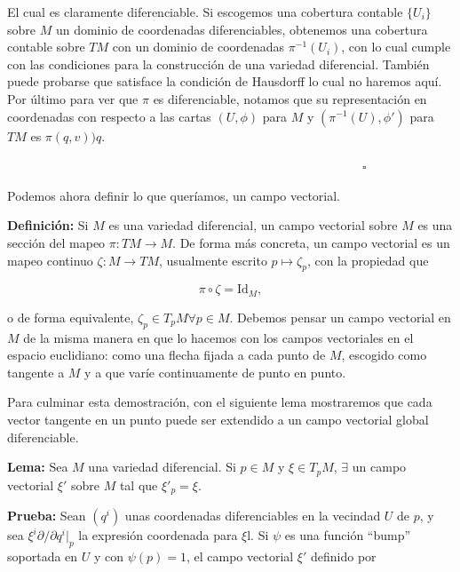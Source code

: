 \documentclass[a4paper,10pt]{article}
\numberwithin{equation}{section}
\newcommand{\definicion}{\textbf{Definición: }}
\newcommand{\lema}{\textbf{Lema: }}
\newcommand{\prueba}{\textbf{Prueba: }}
\begin{document}
El cual es claramente diferenciable. Si escogemos una cobertura contable 
$\{U_i\}$ sobre $M$ un dominio de coordenadas diferenciables, obtenemos 
una cobertura contable sobre $TM$ con un dominio de coordenadas ${\pi^{-1}(U_i)}$,
con lo cual cumple con las condiciones para la construcción de una variedad 
diferencial. También puede probarse que satisface la condición de Hausdorff 
lo cual no haremos aquí. Por último para ver que $\pi$ es diferenciable, 
notamos que su representación en coordenadas con respecto a las cartas 
$(U,\phi)$ para $M$ y $(\pi^{-1}(U),\phi')$ para $TM$ es $\pi(q,v))q$.

$\hspace{12cm} \square$

Podemos ahora definir lo que queríamos, un campo vectorial.

\vspace{.3cm}

\definicion Si $M$ es una variedad diferencial, un campo vectorial 
sobre $M$ es una sección del mapeo $\pi:TM \rightarrow M$. De forma 
más concreta, un campo vectorial es un mapeo continuo $\zeta:M \rightarrow TM$, 
usualmente escrito $p \mapsto \zeta_p$, con la propiedad que 

\begin{equation}
 \pi \circ \zeta = \text{Id}_M,
\end{equation}

o de forma equivalente, $\zeta_p \in T_p M \forall p \in M$. Debemos pensar un 
campo vectorial en $M$ de la misma manera en que lo hacemos con los campos vectoriales 
en el espacio euclidiano: como una flecha fijada a cada punto de $M$, escogido como 
tangente a $M$ y a que varíe continuamente de punto en punto.

\vspace{.3cm}

Para culminar esta demostración, con el siguiente lema mostraremos que cada vector 
tangente en un punto puede ser extendido a un campo vectorial global diferenciable.

\vspace{.3cm}

\lema Sea $M$ una variedad diferencial. Si $p \in M$ y $\xi \in T_p M$, $\exists$ un 
campo vectorial $\xi'$ sobre $M$ tal que $\xi'_p = \xi$.

\vspace{.3cm}

\prueba Sean $(q^i)$ unas coordenadas diferenciables en la vecindad $U$ de $p$, y 
sea $\xi^i \partial/\partial q^i|_p$ la expresión coordenada para $\xi$l. Si $\psi$ 
es una función ``bump'' \cite{curtis} soportada en $U$ y con $\psi(p) = 1$, el 
campo vectorial $\xi'$ definido por 
\end{document}

